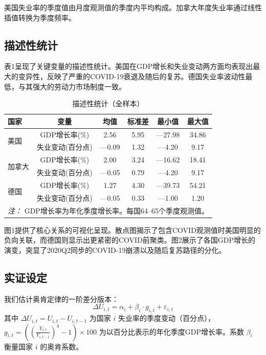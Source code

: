 \documentclass[12pt,a4paper,UTF8]{ctexart}
\begin{document}
美国失业率的季度值由月度观测值的季度内平均构成。加拿大年度失业率通过线性插值转换为季度频率。

\subsection{描述性统计}

表1呈现了关键变量的描述性统计。美国在GDP增长和失业变动两方面均表现出最大的变异性，反映了严重的COVID-19衰退及随后的复苏。德国失业率波动性最低，与其强大的劳动力市场制度一致。

\begin{table}[H]
\centering
\caption{描述性统计（全样本）}
\label{tab:descriptive}
\begin{tabular}{lccccc}
\toprule
国家 & 变量 & 均值 & 标准差 & 最小值 & 最大值 \\
\midrule
\multirow{2}{*}{美国} & GDP增长率(\%) & 2.56 & 5.95 & ---27.98 & 34.86 \\
 & 失业变动(百分点) & ---0.09 & 1.32 & ---4.20 & 9.17 \\
\midrule
\multirow{2}{*}{加拿大} & GDP增长率(\%) & 2.00 & 3.24 & ---16.62 & 18.41 \\
 & 失业变动(百分点) & ---0.05 & 0.79 & ---4.20 & 9.17 \\
\midrule
\multirow{2}{*}{德国} & GDP增长率(\%) & 1.27 & 4.30 & ---39.73 & 54.21 \\
 & 失业变动(百分点) & ---0.05 & 0.33 & ---1.00 & 1.20 \\
\bottomrule
\multicolumn{6}{l}{\textit{注：} GDP增长率为年化季度增长率。每国64--65个季度观测值。}
\end{tabular}
\end{table}

图1提供了核心关系的可视化呈现。散点图揭示了包含COVID观测值时美国明显的负向关联，而德国则显示出更紧密的COVID前聚类。图2展示了各国GDP增长的演变，突显了2020Q2同步的COVID-19崩溃以及随后复苏路径的分化。

\subsection{实证设定}

我们估计奥肯定律的一阶差分版本：
\[
\Delta U_{i,t} = \alpha_i + \beta_i \cdot g_{i,t} + \varepsilon_{i,t}
\]
其中 $\Delta U_{i,t} = U_{i,t} - U_{i,t-1}$ 为国家 $i$ 失业率的季度变动（百分点），$g_{i,t} = \left(\left(\frac{Y_{i,t}}{Y_{i,t-1}}\right)^4 - 1\right) \times 100$ 为以百分比表示的年化季度GDP增长率。系数 $\beta_i$ 衡量国家 $i$ 的奥肯系数。
\end{document}
